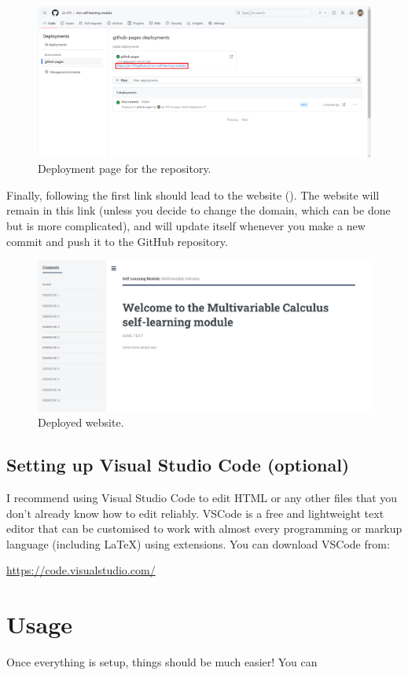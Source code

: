 \documentclass[a4paper,10pt]{article}
\begin{document}
\begin{figure}[htbp]
    \centering
    \includegraphics[width=\textwidth]{deployment.png}
    \caption{Deployment page for the repository.}
    \label{deployment}   
\end{figure}

Finally, following the first link should lead to the website (). The website will remain in this link (unless you decide to change the domain, which can be done but is more complicated), and will update itself whenever you make a new commit and push it to the GitHub repository.

\begin{figure}[htbp]
    \centering
    \includegraphics[width=\textwidth]{website.png}
    \caption{Deployed website.}
    \label{website}   
\end{figure}


\subsection{Setting up Visual Studio Code (optional)}
\label{vscode}

I recommend using Visual Studio Code to edit HTML or any other files that you don't already know how to edit reliably. VSCode is a free and lightweight text editor that can be customised to work with almost every programming or markup language (including \LaTeX) using extensions. You can download VSCode from:

\url{https://code.visualstudio.com/}


\section{Usage}

Once everything is setup, things should be much easier! You can 
\end{document}
